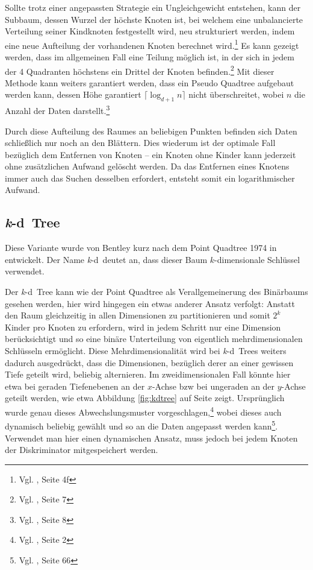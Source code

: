 \documentclass[%
			fontsize=12pt,%
			paper=a4,%
			DIV11,
			liststotoc,
			bibtotoc,
			draft=false,%
			titlepage
			]{scrartcl}
\newcommand{\zit}[3]{#1 \cite{#2}, #3}
\newcommand{\footzit}[3]{\footnote{\zit{#1}{#2}{#3}}}
\newcommand{\kd}{\mbox{\textit{k}-d}}
\begin{document}
Sollte trotz einer angepassten Strategie ein Ungleichgewicht entstehen, kann der Subbaum, dessen Wurzel der höchste Knoten ist, bei welchem eine unbalancierte Verteilung seiner Kindknoten festgestellt wird, neu strukturiert werden, indem eine neue Aufteilung der vorhandenen Knoten berechnet wird.\footzit{Vgl.}{DBLP:journals/acta/OvermarsL82}{Seite 4f} %
Es kann gezeigt werden, dass im allgemeinen Fall eine Teilung möglich ist, in der sich in jedem der 4 Quadranten höchstens ein Drittel der Knoten befinden.\footzit{Vgl.}{DBLP:journals/acta/OvermarsL82}{Seite 7} %
Mit dieser Methode kann weiters garantiert werden, dass ein Pseudo Quadtree aufgebaut werden kann, dessen Höhe garantiert $\lceil \log_{d+1} n\rceil$ nicht überschreitet, wobei $n$ die Anzahl der Daten darstellt.\footzit{Vgl.}{DBLP:journals/acta/OvermarsL82}{Seite 8}

Durch diese Aufteilung des Raumes an beliebigen Punkten befinden sich Daten schließlich nur noch an den Blättern. Dies wiederum ist der optimale Fall bezüglich dem Entfernen von Knoten -- ein Knoten ohne Kinder kann jederzeit ohne zusätzlichen Aufwand gelöscht werden. Da das Entfernen eines Knotens immer auch das Suchen desselben erfordert, entsteht somit ein logarithmischer Aufwand.


\subsection{\kd\ Tree}
Diese Variante wurde von Bentley kurz nach dem Point Quadtree 1974 in \cite{Bentley:1975} entwickelt. Der Name \kd\ deutet an, dass dieser Baum $k$-dimensionale Schlüssel verwendet. 

Der \kd\ Tree kann wie der Point Quadtree als Verallgemeinerung des Binärbaums gesehen werden, hier wird hingegen ein etwas anderer Ansatz verfolgt:
Anstatt den Raum gleichzeitig in allen Dimensionen zu partitionieren und somit $2^k$ Kinder pro Knoten zu erfordern, wird in jedem Schritt nur eine Dimension berücksichtigt und so eine binäre Unterteilung von eigentlich mehrdimensionalen Schlüsseln ermöglicht.
Diese Mehrdimensionalität wird bei \kd\ Trees weiters dadurch ausgedrückt, dass die Dimensionen, bezüglich derer an einer gewissen Tiefe geteilt wird, beliebig alternieren.
Im zweidimensionalen Fall könnte hier etwa bei geraden Tiefenebenen an der $x$-Achse bzw bei ungeraden an der $y$-Achse geteilt werden, wie etwa Abbildung \ref{fig:kdtree} auf Seite \pageref{fig:kdtree} zeigt.
Ursprünglich wurde genau dieses Abwechslungsmuster vorgeschlagen,\footzit{Vgl.}{Bentley:1975}{Seite 2}
wobei dieses auch dynamisch beliebig gewählt und so an die Daten angepasst werden kann\footzit{Vgl.}{Samet90}{Seite 66}.
Verwendet man hier einen dynamischen Ansatz, muss jedoch bei jedem Knoten der Diskriminator mitgespeichert werden.
\end{document}
